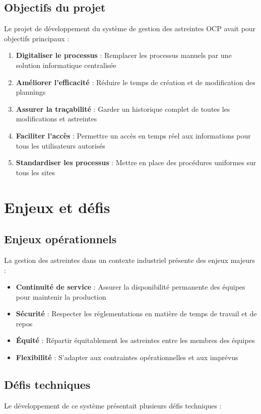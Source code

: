 \subsection{Objectifs du projet}
Le projet de développement du système de gestion des astreintes OCP avait pour objectifs principaux :

\begin{enumerate}
    \item \textbf{Digitaliser le processus} : Remplacer les processus manuels par une solution informatique centralisée
    \item \textbf{Améliorer l'efficacité} : Réduire le temps de création et de modification des plannings
    \item \textbf{Assurer la traçabilité} : Garder un historique complet de toutes les modifications et astreintes
    \item \textbf{Faciliter l'accès} : Permettre un accès en temps réel aux informations pour tous les utilisateurs autorisés
    \item \textbf{Standardiser les processus} : Mettre en place des procédures uniformes sur tous les sites
\end{enumerate}

\section{Enjeux et défis}
\subsection{Enjeux opérationnels}
La gestion des astreintes dans un contexte industriel présente des enjeux majeurs :

\begin{itemize}
    \item \textbf{Continuité de service} : Assurer la disponibilité permanente des équipes pour maintenir la production
    \item \textbf{Sécurité} : Respecter les réglementations en matière de temps de travail et de repos
    \item \textbf{Équité} : Répartir équitablement les astreintes entre les membres des équipes
    \item \textbf{Flexibilité} : S'adapter aux contraintes opérationnelles et aux imprévus
\end{itemize}

\subsection{Défis techniques}
Le développement de ce système présentait plusieurs défis techniques :

